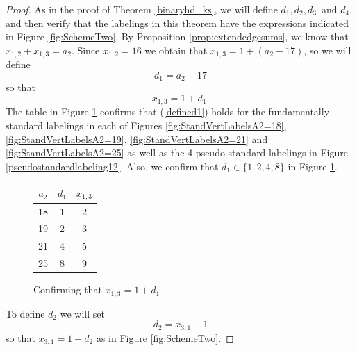 \documentclass[10pt, reqno]{amsart}
\theoremstyle{definition}
\theoremstyle{plain}
\begin{document}
\begin{proof}
  As in the proof of Theorem \ref{binaryhd_ks}, we will define $d_1, d_2, d_3$\ and $d_4$,
  and then verify that the labelings in this theorem have the expressions indicated in Figure \ref{fig:SchemeTwo}. 
  By Proposition \ref{prop:extendedgesums}, we know that $x_{1,2}+x_{1,3}=a_2$. 
  Since $x_{1,2}=16$ we obtain that $x_{1,3}=1+(a_2-17)$, so we will define
  \begin{equation*}
      d_1=a_2-17
  \end{equation*}
so that 
\begin{equation}
    x_{1,3}=1+d_1.   \label{defined1}
\end{equation}
The table in Figure \ref{d1verticalbalance} confirms that (\ref{defined1}) holds for  the fundamentally standard labelings in each 
of Figures \ref{fig:StandVertLabelsA2=18}, \ref{fig:StandVertLabelsA2=19}, \ref{fig:StandVertLabelsA2=21} 
and \ref{fig:StandVertLabelsA2=25} as well as the 4 pseudo-standard labelings in Figure \ref{pseudostandardlabeling12}. 
Also, we confirm that $d_1\in\{1,2,4,8\}$ in Figure \ref{d1verticalbalance}.
\begin{figure}
\centering
\renewcommand{\arraystretch}{1.5}
\begin{tabular}{|c|c|c|} \hline
       $a_2$  & $d_1$ & $x_{1,3}$ \\  \hline
        18  & 1 & 2  \\  \hline
       19  &  2 & 3 \\  \hline
        21  & 4 & 5 \\  \hline
        25 & 8 & 9 \\ \hline
    \end{tabular}
\caption{Confirming that $x_{1,3}=1+d_1$}\label{d1verticalbalance} 
\end{figure} 
To define $d_2$ we will set 
\begin{equation*}
d_2=x_{3,1}-1
\end{equation*}
so that $x_{3,1}=1+d_2$ as in Figure \ref{fig:SchemeTwo}. 


\end{proof}
\end{document}
